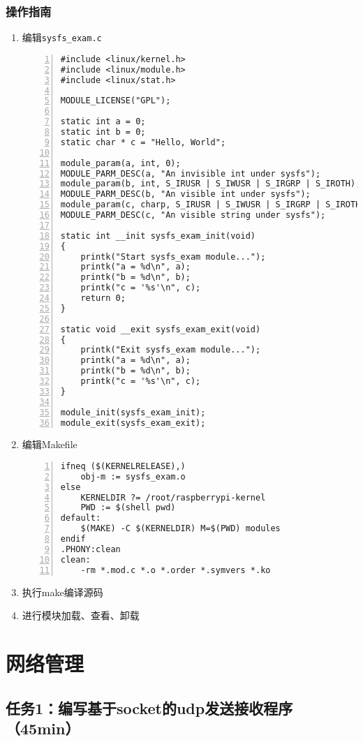 \documentclass{article}
\begin{document}
\subsubsection{操作指南}
\begin{enumerate}

	\item 编辑\verb|sysfs_exam.c|
\begin{lstlisting}[numbers=left]
#include <linux/kernel.h>
#include <linux/module.h>
#include <linux/stat.h>
 
MODULE_LICENSE("GPL");

static int a = 0;
static int b = 0;
static char * c = "Hello, World";
 
module_param(a, int, 0);
MODULE_PARM_DESC(a, "An invisible int under sysfs");
module_param(b, int, S_IRUSR | S_IWUSR | S_IRGRP | S_IROTH);
MODULE_PARM_DESC(b, "An visible int under sysfs");
module_param(c, charp, S_IRUSR | S_IWUSR | S_IRGRP | S_IROTH);
MODULE_PARM_DESC(c, "An visible string under sysfs");
 
static int __init sysfs_exam_init(void)
{
	printk("Start sysfs_exam module...");
	printk("a = %d\n", a);
	printk("b = %d\n", b);
	printk("c = '%s'\n", c);
	return 0; 
}

static void __exit sysfs_exam_exit(void) 
{
	printk("Exit sysfs_exam module...");
	printk("a = %d\n", a);
	printk("b = %d\n", b);
	printk("c = '%s'\n", c); 
}
 
module_init(sysfs_exam_init);
module_exit(sysfs_exam_exit);

\end{lstlisting}
    \item 编辑Makefile
\begin{lstlisting}[numbers=left]
ifneq ($(KERNELRELEASE),)
	obj-m := sysfs_exam.o
else
	KERNELDIR ?= /root/raspberrypi-kernel
	PWD := $(shell pwd)
default:
	$(MAKE) -C $(KERNELDIR) M=$(PWD) modules
endif
.PHONY:clean
clean:
	-rm *.mod.c *.o *.order *.symvers *.ko

\end{lstlisting}
    \item 执行make编译源码
    \item 进行模块加载、查看、卸载
\end{enumerate}

\newpage


\section{网络管理}
\subsection{任务1：编写基于socket的udp发送接收程序（45min）}
\end{document}
